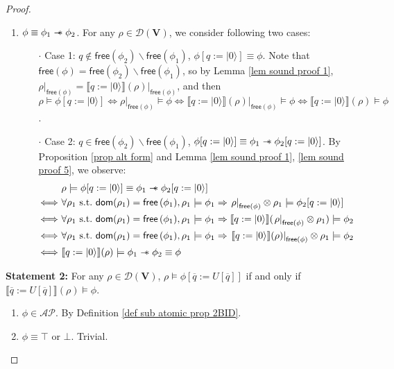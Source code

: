 \documentclass[conference,compsoc, 10pt]{IEEEtran}
\newcommand {\qI} {{q:=|0\rangle}}
\newcommand {\qU} {{\overline{q}:=U[\overline{q}]}}
\newcommand {\cD } {{\mathcal{D}}}
\newcommand {\dom }[1] {{\mathsf{dom}\!\left(#1\right)}}
\newcommand {\free }[1] {{\mathsf{free}\left(#1\right)}}
\newcommand {\rt }[2] {{\left.{#1}\right|_{#2}}}
\newcommand {\vars } {\mathbf{V}}
\newcommand {\sepimp} {\mathrel{-\mkern-6mu*}}
\newcommand {\sem}[1] {\llbracket#1\rrbracket}
\newcommand {\AP} {{\mathcal{AP}}}
\begin{document}
\begin{appendices}
\begin{proof}
\begin{enumerate}
				\item $\phi \equiv \phi_1\sepimp\phi_2$. For any $\rho\in\cD(\vars)$, we consider following two cases:
				\begin{itemize}
					\item[$\cdot$] Case 1: $q\notin\free{\phi_2}\backslash\free{\phi_1}$, $\phi[\qI]\equiv\phi$. Note that $\free{\phi} = \free{\phi_2}\backslash\free{\phi_1}$, so by Lemma \ref{lem sound proof 1}, $\rt{\rho}{\free{\phi}} = \rt{\sem{\qI}(\rho)}{\free{\phi}}$, and then $\rho\models\phi[\qI]\Leftrightarrow\rt{\rho}{\free{\phi}}\models\phi\Leftrightarrow\rt{\sem{\qI}(\rho)}{\free{\phi}}\models\phi\Leftrightarrow\sem{\qI}(\rho)\models\phi$.
					\item[$\cdot$] Case 2: $q\in\free{\phi_2}\backslash\free{\phi_1}$, $\phi[\qI]\equiv\phi_1\sepimp\phi_2[\qI]$. By Proposition \ref{prop alt form} and Lemma \ref{lem sound proof 1}, \ref{lem sound proof 5}, we observe:
					\begin{align*}
					&\rho\models\phi[\qI]\equiv\phi_1\sepimp\phi_2[\qI] \\
					\Longleftrightarrow\ &\forall\rho_1\text{\ s.t.\ }\dom{\rho_1}=\free{\phi_1}, \rho_1\models\phi_1\Rightarrow\rt{\rho}{\free{\phi}}\otimes\rho_1\models\phi_2[\qI] \\
					\Longleftrightarrow\ &\forall\rho_1\text{\ s.t.\ }\dom{\rho_1}=\free{\phi_1}, \rho_1\models\phi_1\Rightarrow\sem{\qI}(\rt{\rho}{\free{\phi}}\otimes\rho_1)\models\phi_2\\
					\Longleftrightarrow\ &\forall\rho_1\text{\ s.t.\ }\dom{\rho_1}=\free{\phi_1}, \rho_1\models\phi_1\Rightarrow\rt{\sem{\qI}(\rho)}{\free{\phi}}\otimes\rho_1\models\phi_2 \\
					\Longleftrightarrow\ &\sem{\qI}(\rho)\models\phi_1\sepimp\phi_2\equiv\phi
					\end{align*}
				\end{itemize}
				
			\end{enumerate}
			
			
			{\bf Statement 2:} For any $\rho\in\cD(\vars)$, $\rho\models\phi[\qU]$ if and only if $\sem{\qU}(\rho)\models\phi$.
			\begin{enumerate}
				\item $\phi\in\AP$. By Definition \ref{def sub atomic prop 2BID}.
				
				\item $\phi \equiv \top$ or $\bot$. Trivial.
				

\end{enumerate}
\end{proof}
\end{appendices}
\end{document}
